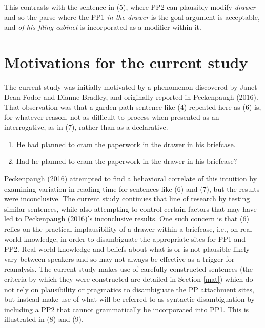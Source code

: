 \documentclass[11pt,oneside]{book}
\begin{document}
This contrasts with the sentence in (5), where PP2 can plausibly modify \emph{drawer} and so the parse where the PP1 \emph{in the drawer} is the goal argument is acceptable, and \emph{of his filing cabinet} is incorporated as a modifier within it.

\hypertarget{obs}{%
\section{Motivations for the current study}\label{obs}}

The current study was initially motivated by a phenomenon discovered by Janet Dean Fodor and Dianne Bradley, and originally reported in Peckenpaugh (2016). That observation was that a garden path sentence like (4) repeated here as (6) is, for whatever reason, not as difficult to process when presented as an interrogative, as in (7), rather than as a declarative.

\begin{enumerate}
\def\labelenumi{(\arabic{enumi})}
\setcounter{enumi}{5}
\item
  He had planned to cram the paperwork in the drawer in his briefcase.
\item
  Had he planned to cram the paperwork in the drawer in his briefcase?
\end{enumerate}

Peckenpaugh (2016) attempted to find a behavioral correlate of this intuition by examining variation in reading time for sentences like (6) and (7), but the results were inconclusive. The current study continues that line of research by testing similar sentences, while also attempting to control certain factors that may have led to Peckenpaugh (2016)'s inconclusive results. One such concern is that (6) relies on the practical implausibility of a drawer within a briefcase, i.e., on real world knowledge, in order to disambiguate the appropriate sites for PP1 and PP2. Real world knowledge and beliefs about what is or is not plausible likely vary between speakers and so may not always be effective as a trigger for reanalysis. The current study makes use of carefully constructed sentences (the criteria by which they were constructed are detailed in Section \ref{mat}) which do not rely on plausibility or pragmatics to disambiguate the PP attachment sites, but instead make use of what will be referred to as syntactic disambiguation by including a PP2 that cannot grammatically be incorporated into PP1. This is illustrated in (8) and (9).
\end{document}
